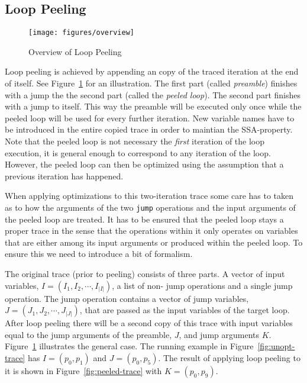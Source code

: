 \documentclass[preprint]{sigplanconf}
\begin{document}
\subsection{Loop Peeling}

\begin{figure}
\begin{center}
\texttt{[image: figures/overview]}
\end{center}
\caption{Overview of Loop Peeling}
\label{fig:overview}
\end{figure}

Loop peeling is achieved by appending an copy of the traced iteration at
the end of itself. See Figure~\ref{fig:overview} for an illustration.
The first part (called \emph{preamble}) finishes with a jump the the second part
(called the \emph{peeled loop}). The second part finishes with a jump to itself. This way
the preamble will be executed only once while the peeled loop will
be used for every further iteration. New variable names have to be
introduced in the entire copied trace in order to maintian the SSA-property.
Note that the peeled loop is not necessary the \emph{first} iteration of the
loop execution, it is general enough to correspond to any iteration of the loop.
However, the peeled loop can then be optimized using the assumption that a
previous iteration has happened.


When applying optimizations to this two-iteration trace
some care has to taken as to how the arguments of the two
\lstinline{jump} operations and the input arguments of the peeled loop are
treated. It has to be ensured that the peeled loop stays a proper
trace in the sense that the operations within it only operates on
variables that are either among its input arguments 
or produced within the peeled loop. To ensure this we need
to introduce a bit of formalism.

The original trace (prior to peeling) consists of three parts.
A vector of input
variables, $I=\left(I_1, I_2, \cdots, I_{|I|}\right)$, a list of non-
jump operations and a single
jump operation. The jump operation contains a vector of jump variables,
$J=\left(J_1, J_2, \cdots, J_{|J|}\right)$, that are passed as the input variables of the target loop. After
loop peeling there will be a second copy of this trace with input
variables equal to the jump arguments of the preamble, $J$, and jump
arguments $K$. 
Figure~\ref{fig:overview} illustrates the general case. The running
example in Figure~\ref{fig:unopt-trace} has  $I = \left( p_0, p_1
\right)$ and $J = \left( p_0, p_5 \right)$. The result of applying
loop peeling to it is shown in Figure~\ref{fig:peeled-trace} with 
$K = \left( p_0, p_9 \right)$. 
\end{document}
